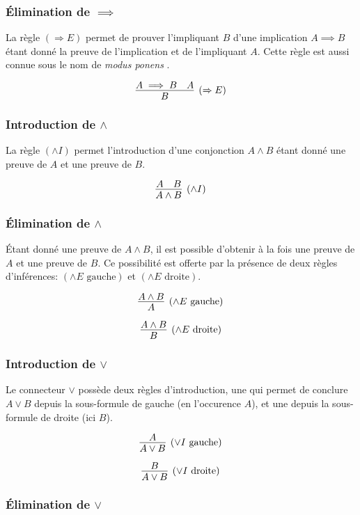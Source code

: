 \subsubsection{Élimination de $\implies$}

La règle $({\Rightarrow{}}E)$ permet de prouver l'impliquant $B$ d'une implication $A \implies B$ étant donné la preuve de l'implication et de l'impliquant $A$. Cette règle est aussi connue sous le nom de \og \textit{modus ponens} \fg{}.

\[
\infer[({\Rightarrow{}}E)]{B}{A \implies B & A}
\]

\subsubsection{Introduction de $\wedge$}

La règle $({\wedge}I)$ permet l'introduction d'une conjonction $A \wedge B$ étant donné une preuve de $A$ et une preuve de $B$.

\[
\infer[({\wedge{}}I)]{A \wedge B}{A & B}
\]

\subsubsection{Élimination de $\wedge$}

Étant donné une preuve de $A \wedge B$, il est possible d'obtenir à la fois une preuve de $A$ et une preuve de $B$.
Ce possibilité est offerte par la présence de deux règles d'inférences: $({\wedge{}}E\text{ gauche})$ et $({\wedge{}}E\text{ droite})$.

\[
\infer[({\wedge{}}E\text{ gauche})]{A}{A \wedge B}
\]

\[
\infer[({\wedge{}}E\text{ droite})]{B}{A \wedge B}
\]

\subsubsection{Introduction de $\vee$}

Le connecteur ${\vee}$ possède deux règles d'introduction, une qui permet de conclure $A \vee B$ depuis la sous-formule de gauche (en l'occurence $A$), et une depuis la sous-formule de droite (ici $B$).

\[
\infer[({\vee}I\text{ gauche})]{A \vee B}{A}
\]

\[
\infer[({\vee}I\text{ droite})]{A \vee B}{B}
\]

\subsubsection{Élimination de $\vee$}

